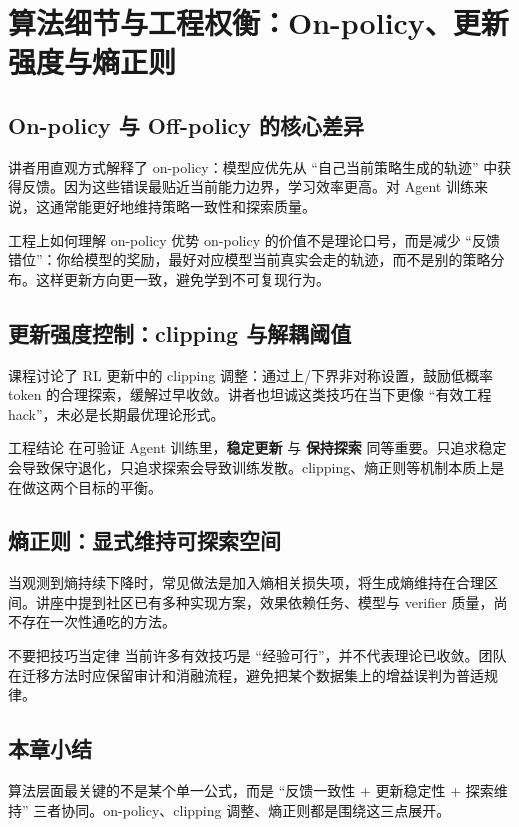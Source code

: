 \section{算法细节与工程权衡：On-policy、更新强度与熵正则}

\subsection{On-policy 与 Off-policy 的核心差异}
讲者用直观方式解释了 on-policy：模型应优先从 ``自己当前策略生成的轨迹'' 中获得反馈。因为这些错误最贴近当前能力边界，学习效率更高。对 Agent 训练来说，这通常能更好地维持策略一致性和探索质量。

\begin{knowledgebox}{工程上如何理解 on-policy 优势}
on-policy 的价值不是理论口号，而是减少 ``反馈错位''：你给模型的奖励，最好对应模型当前真实会走的轨迹，而不是别的策略分布。这样更新方向更一致，避免学到不可复现行为。
\end{knowledgebox}

\subsection{更新强度控制：clipping 与解耦阈值}
课程讨论了 RL 更新中的 clipping 调整：通过上/下界非对称设置，鼓励低概率 token 的合理探索，缓解过早收敛。讲者也坦诚这类技巧在当下更像 ``有效工程 hack''，未必是长期最优理论形式。

\begin{importantbox}{工程结论}
在可验证 Agent 训练里，\textbf{稳定更新} 与 \textbf{保持探索} 同等重要。只追求稳定会导致保守退化，只追求探索会导致训练发散。clipping、熵正则等机制本质上是在做这两个目标的平衡。
\end{importantbox}

\subsection{熵正则：显式维持可探索空间}
当观测到熵持续下降时，常见做法是加入熵相关损失项，将生成熵维持在合理区间。讲座中提到社区已有多种实现方案，效果依赖任务、模型与 verifier 质量，尚不存在一次性通吃的方法。

\begin{warningbox}{不要把技巧当定律}
当前许多有效技巧是 ``经验可行''，并不代表理论已收敛。团队在迁移方法时应保留审计和消融流程，避免把某个数据集上的增益误判为普适规律。
\end{warningbox}

\subsection{本章小结}
算法层面最关键的不是某个单一公式，而是 ``反馈一致性 + 更新稳定性 + 探索维持'' 三者协同。on-policy、clipping 调整、熵正则都是围绕这三点展开。

